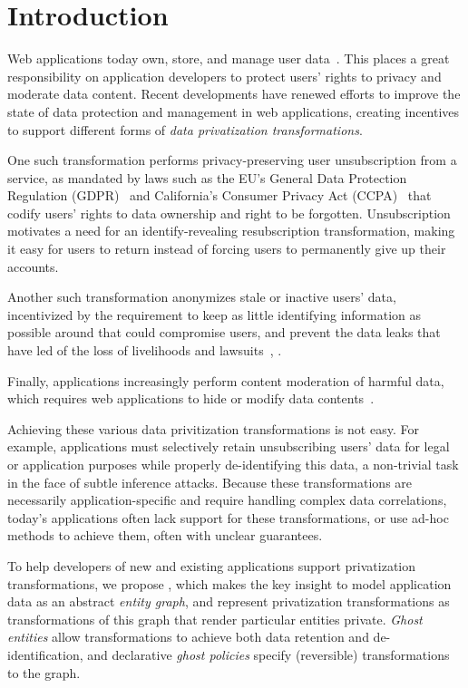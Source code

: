 \section{Introduction}
Web applications today own, store, and manage user data~\cite{nytimes:fb, npr:data}. 
This places a great responsibility on application developers to protect users' rights to privacy and
moderate data content.
%
Recent developments have renewed efforts to improve the state of data protection and management in
web applications, creating incentives to support different forms of \emph{data privatization 
transformations}. 

One such transformation performs privacy-preserving user unsubscription from a service, as mandated
by laws such as the EU's General Data Protection Regulation (GDPR)~\cite{eu:gdpr} and California's
Consumer Privacy Act (CCPA)~\cite{ca:privacy-act} that codify users' rights to data ownership and
right to be forgotten.  Unsubscription motivates a need for an identify-revealing resubscription
transformation, making it easy for users to return instead of forcing users to permanently give up
their accounts.

Another such transformation anonymizes stale or inactive users' data, 
incentivized by the requirement to keep as little identifying information as possible
around that could compromise users, and prevent the data leaks that have led of the loss of livelihoods and
lawsuits~\cite{breach:amazon,breach:twitter, breach:fb, breach:marriott, breach:quora}, .

Finally, applications increasingly perform content moderation of harmful data, which requires web
applications to hide or modify data contents~\cite{contentmod, sasb}.

Achieving these various data privitization transformations is not easy.  For example, applications must
selectively retain unsubscribing users' data for legal or application purposes while properly
de-identifying this data, a non-trivial task in the face of subtle inference attacks.  Because these
transformations are necessarily application-specific and require handling complex data correlations,
today's applications often lack support for these transformations, or use ad-hoc methods to achieve
them, often with unclear guarantees.

To help developers of new and existing applications support privatization transformations, we
propose \sys, which makes the key insight to model application data as an abstract \emph{entity
graph}, and represent privatization transformations as transformations of this graph that render
particular entities private. \emph{Ghost entities} allow transformations to achieve both data
retention and de-identification, and declarative \emph{ghost policies} specify (reversible)
transformations to the graph.

